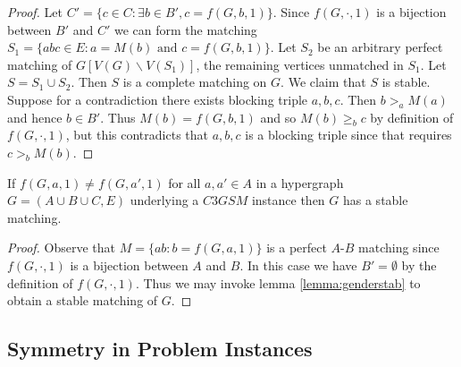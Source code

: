 \begin{proof}
Let $C' = \{ c \in C : \exists b\in B', c = f(G,b,1)\}$. Since $f(G,\cdot,1)$ is a bijection between $B'$ and $C'$ we can form the matching $S_1 = \{abc \in E: a = M(b)\text{ and } c = f(G,b,1)\}$. Let $S_2$ be an arbitrary perfect matching of $G[V(G) \backslash V(S_1)]$, the remaining vertices unmatched in $S_1$. Let $S = S_1 \cup S_2$. Then $S$ is a complete matching on $G$. We claim that $S$ is stable. Suppose for a contradiction there exists blocking triple $a,b,c$. Then $b >_a M(a)$ and hence $b \in B'$. Thus $M(b) = f(G,b,1)$ and so $M(b) \geq_b c$ by definition of $f(G,\cdot,1)$, but this contradicts that $a,b,c$ is a blocking triple since that requires $c >_b M(b)$.
\end{proof}
\begin{corollary}\label{cor:alldiff}
If $f(G,a,1) \neq f(G,a',1)$ for all $a,a' \in A$ in a hypergraph $G=(A\cup B \cup C, E)$ underlying a $C3GSM$ instance then $G$ has a stable matching.
\end{corollary}
\begin{proof}
Observe that $M = \{ab : b = f(G,a,1)\}$ is a perfect $A$-$B$ matching since $f(G,\cdot, 1)$ is a bijection between $A$ and $B$. In this case we have $B' = \emptyset$ by the definition of $f(G,\cdot,1)$. Thus we may invoke lemma \ref{lemma:genderstab} to obtain a stable matching of $G$.
\end{proof}
\subsection{Symmetry in Problem Instances}\label{subsec:symmetry}
